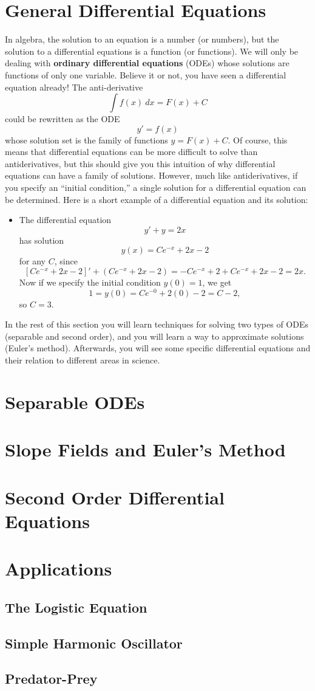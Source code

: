 
\section{General Differential Equations}

In algebra, the solution to an equation is a number (or numbers), but the solution to a differential equations is a function (or functions). We will only be dealing with \textbf{ordinary differential equations} (ODEs) whose solutions are functions of only one variable. Believe it or not, you have seen a differential equation already! The anti-derivative
$$\int f(x)\ dx = F(x)+C$$
could be rewritten as the ODE
$$y' = f(x)$$
whose solution set is the family of functions $y=F(x)+C$. Of course, this means that differential equations can be more difficult to solve than antiderivatives, but this should give you this intuition of why differential equations can have a family of solutions. However, much like antiderivatives, if you specify an ``initial condition,'' a single solution for a differential equation can be determined. Here is a short example of a differential equation and its solution:
\begin{itemize}
\item The differential equation
$$y' + y = 2x$$
has solution 
$$y(x) = C e^{-x} + 2 x - 2$$
for any $C$, since
$$
\left[C e^{-x} + 2 x - 2\right]'+\left(C e^{-x} + 2 x - 2\right)=
-C e^{-x} + 2+ C e^{-x} + 2 x - 2 = 2x.
$$
Now if we specify the initial condition $y(0)=1$, we get
$$ 1=y(0)=C e^{-0} + 2 (0) - 2 = C - 2,$$
so $C=3$.
\end{itemize}

In the rest of this section you will learn techniques for solving two types of ODEs (separable and second order), and you will learn a way to approximate solutions (Euler's method). Afterwards, you will see some specific differential equations and their relation to different areas in science.



\section{Separable ODEs}


\section{Slope Fields and Euler's Method}


\section{Second Order Differential Equations}


\section{Applications}
\subsection{The Logistic Equation}
\subsection{Simple Harmonic Oscillator}
\subsection{Predator-Prey}
